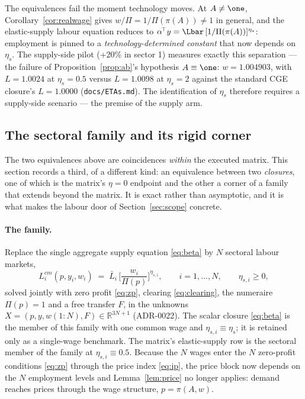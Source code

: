 \begin{remark}\label{rem:supply}
The equivalences fail the moment technology moves. At $A \neq \one$,
Corollary~\ref{cor:realwage} gives $w/\Pi = 1/\Pi(\pi(A)) \neq 1$ in
general, and the elastic-supply labour equation reduces to
$\alpha^{\!\top}y = \Lbar\,[1/\Pi(\pi(A))]^{\eta_s}$: employment is pinned
to a \emph{technology-determined constant} that now depends on $\eta_s$.
The supply-side pilot (+20\% in sector 1) measures exactly this separation
--- the failure of Proposition~\ref{prop:ab}'s hypothesis $A \equiv \one$:
$w = 1.004903$, with $L = 1.0024$ at $\eta_s = 0.5$ versus $L = 1.0098$ at
$\eta_s = 2$ against the standard CGE closure's $L = 1.0000$
(\texttt{docs/ETAs.md}). The
identification of $\eta_s$ therefore requires a supply-side scenario ---
the premise of the supply arm.
\end{remark}

\subsection{The sectoral family and its rigid corner}\label{sec:sectoral}

The two equivalences above are coincidences \emph{within} the executed matrix.
This section records a third, of a different kind: an equivalence between two
\emph{closures}, one of which is the matrix's $\eta = 0$ endpoint and the other
a corner of a family that extends beyond the matrix. It is exact rather than
asymptotic, and it is what makes the labour door of Section~\ref{sec:scope}
concrete.

\paragraph{The family.} Replace the single aggregate supply equation
\eqref{eq:beta} by $N$ sectoral labour markets,
\begin{equation}
L^{cm}_i(p, y_i, w_i) \;=\; \bar{L}_i\,
   \Big[ \frac{w_i}{\Pi(p)} \Big]^{\eta_{s,i}},
\qquad i = 1, \dots, N, \qquad \eta_{s,i} \geq 0,
\label{eq:etas}
\end{equation}
solved jointly with zero profit \eqref{eq:zp}, clearing \eqref{eq:clearing},
the numeraire $\Pi(p) = 1$ and a free transfer $F$, in the unknowns
$X = (p, y, w(1{:}N), F) \in \mathbb{R}^{3N+1}$ (ADR-0022). The scalar closure
\eqref{eq:beta} is the member of this family with one common wage and
$\eta_{s,i} \equiv \eta_s$; it is retained only as a single-wage benchmark.
The matrix's elastic-supply row is the sectoral member of the family at
$\eta_{s,i} \equiv 0.5$. Because the $N$
wages enter the $N$ zero-profit conditions \eqref{eq:zp} through the price
index \eqref{eq:ip}, the price block now depends on the $N$ employment levels
and Lemma~\ref{lem:price} no longer applies: demand reaches prices through the
wage structure, $p = \pi(A, w)$.


